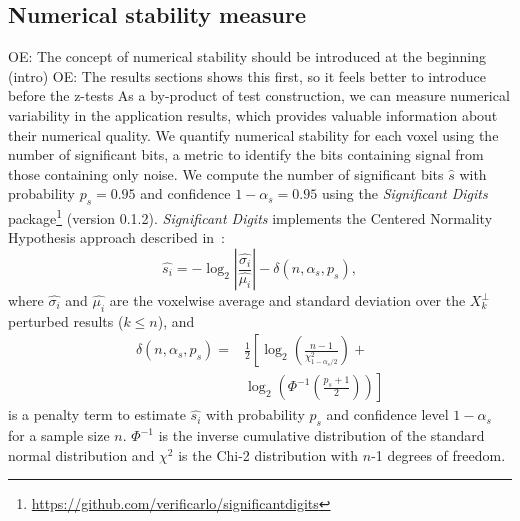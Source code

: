 \documentclass[lettersize,journal]{IEEEtran}
\newcommand{\oesteban}[1]{\color{orange}\textsc{OE:} #1\color{black}\xspace}
\begin{document}
\subsection{Numerical stability measure}
\oesteban{The concept of numerical stability should be introduced at the beginning (intro)}
\oesteban{The results sections shows this first, so it feels better to introduce before the z-tests}
As a by-product of test construction, we can measure numerical variability in the application results, which provides valuable information about their numerical quality.
We quantify numerical stability for each voxel using the number of significant bits, a metric to identify the bits containing signal from those containing only noise. We compute the number of significant bits $\hat{s}$ with probability $p_s=0.95$ and confidence $1-\alpha_s=0.95$ using the \emph{Significant Digits} package\footnote{\url{https://github.com/verificarlo/significantdigits}} (version 0.1.2).
\emph{Significant Digits} implements the Centered Normality Hypothesis approach described in~\cite{sohier2021confidence}:
\[
    \hat{s_i} = -\log_2 \left| \frac{\hat{\sigma_i}}{\hat{\mu_i}} \right| - \delta(n, \alpha_s, p_s),
\]
where $\hat{\sigma_i}$ and $\hat{\mu_i}$ are the voxelwise average and standard deviation over the $X_k^\perp$ perturbed results ($k \leq n$), and
\begin{equation}
    \begin{split}
        \delta(n, \alpha_s, p_s) =& \frac{1}{2} \left[ \log_2 \left( \frac{n-1}{\chi^2_{1-\alpha_s/2}} \right) + \right. \\
            &  \left. \log_2 \left( \Phi^{-1} \left( \frac{p_s+1}{2} \right) \right) \right]
    \end{split}
\end{equation}
  is a penalty term to estimate $\hat{s_i}$ with probability $p_s$ and confidence level $1-\alpha_s$ for a sample size $n$.
$\Phi^{-1}$ is the inverse cumulative distribution of the standard normal distribution and $\chi^2$ is the Chi-2 distribution with $n$-1 degrees of freedom.
\end{document}
